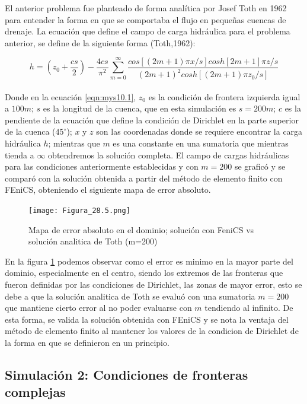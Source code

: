 El anterior problema fue planteado de forma analítica por Josef Toth en 1962 para entender la forma en que se comportaba el flujo en pequeñas cuencas de drenaje. La ecuación que define el campo de carga hidráulica para el problema anterior, se define de la siguiente forma (Toth,1962):

\begin{equation}
 \label{eqn:mys10.1}
  h= (z_{0}+\dfrac{cs}{2})-\dfrac{4cs}{{\pi}^{2}}{\sum_{m=0}^{\infty}\dfrac{cos[(2m+1){\pi}x/s]cosh[2m+1]{\pi}z/s}{(2m+1)^{2}cosh[(2m+1){\pi}z_{0}/s]}} 
\end{equation}  
\\

Donde en la ecuación \ref{eqn:mys10.1}, $z_{0}$ es la condición de frontera izquierda igual a $100 m$; $s$ es la longitud de la cuenca, que en esta simulación es $s= 200 m$; $c$ es la pendiente de la ecuación que define la condición de Dirichlet en la parte superior de la cuenca ($45^{\circ}$); $x$ y $z$ son las coordenadas donde se requiere encontrar la carga hidráulica $h$; mientras que $m$ es una constante en una sumatoria que mientras tienda a $\infty$ obtendremos la solución completa. El campo de cargas hidráulicas para las condiciones anteriormente establecidas y con $m=200$ se graficó y se comparó con la solución obtenida a partir del método de elemento finito con FEniCS, obteniendo el siguiente mapa de error absoluto.

 \begin{figure}[H]
\centering
\texttt{[image: Figura\_28.5.png]}
\caption{Mapa de error absoluto en el dominio; solución con FeniCS vs solución analitica de Toth (m=200)}
\label{Figura3:4.5}
\end{figure}

En la figura \ref{Figura3:4.5} podemos observar como el error es minimo en la mayor parte del dominio, especialmente en el centro, siendo los extremos de las fronteras que fueron definidas por las condiciones de Dirichlet, las zonas de mayor error, esto se debe a que la solución analitica de Toth se evaluó con una sumatoria $m=200$ que mantiene cierto error al no poder evaluarse con $m$ tendiendo al infinito. De esta forma, se valida la solución obtenida con FEniCS y  
se nota la ventaja del método de elemento finito al mantener  los valores de la condicion de Dirichlet de la forma en que se definieron en un principio.  

\subsection{Simulación 2: Condiciones de fronteras complejas}

